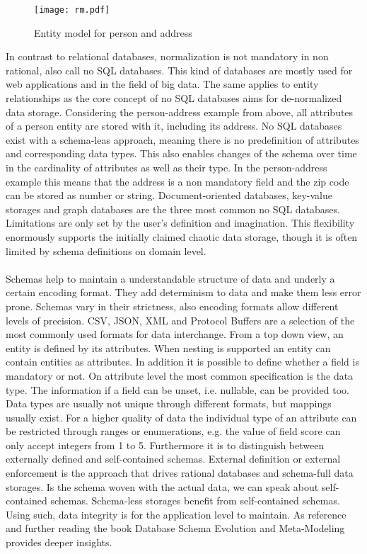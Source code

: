 \begin{figure}[htb]
  \centering
  \texttt{[image: rm.pdf]}\\
  \caption{Entity model for person and address}\label{fig:rm}
\end{figure}

In contrast to relational databases, normalization is not mandatory in non rational, also call no SQL databases. This kind of databases are mostly used for web applications and in the field of big data. The same applies to entity relationships as the core concept of no SQL databases aims for de-normalized data storage. Considering the person-address example from above, all attributes of a person entity are stored with it, including its address. No SQL databases exist with a schema-leas approach, meaning there is no predefinition of attributes and corresponding data types. This also enables changes of the schema over time in the cardinality of attributes as well as their type. In the person-address example this means that the address is a non mandatory field and the zip code can be stored as number or string. Document-oriented databases, key-value storages and graph databases are the three most common no SQL databases.  Limitations are only set by the user's definition and imagination. This flexibility enormously supports the initially claimed chaotic data storage, though it is often limited by schema definitions on domain level. 
\\\\
Schemas help to maintain a understandable structure of data and underly a certain encoding format. They add determinism to data and make them less error prone. Schemas vary in their strictness, also encoding formats allow different levels of precision. CSV, JSON, XML and Protocol Buffers are a selection of the most commonly used formats for data interchange. From a top down view, an entity is defined by its attributes. When nesting is supported an entity can contain entities as attributes. In addition it is possible to define whether a field is mandatory or not. On attribute level the most common specification is the data type. The information if a field can be unset, i.e. nullable, can be provided too. Data types are usually not unique through different formats, but mappings usually exist. For a higher quality of data the individual type of an attribute can be restricted through ranges or enumerations, e.g. the value of field score can only accept integers from 1 to 5. Furthermore it is to distinguish between externally defined and self-contained schemas. External definition or external enforcement is the approach that drives rational databases and schema-full data storages. Is the schema woven with the actual data, we can speak about self-contained schemas. Schema-less storages benefit from self-contained schemas. Using such, data integrity is for the application level to maintain. As reference and further reading the book Database Schema Evolution and Meta-Modeling \cite{balsters_brock_conrad_2006} provides deeper insights.
